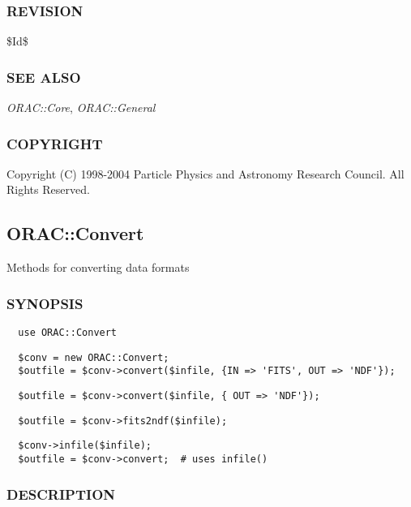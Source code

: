 \subsubsection*{REVISION\label{ORAC::Basic_REVISION}}


\$Id\$

\subsubsection*{SEE ALSO\label{ORAC::Basic_SEE_ALSO}}


\emph{ORAC::Core}, \emph{ORAC::General}

\subsubsection*{COPYRIGHT\label{ORAC::Basic_COPYRIGHT}}


Copyright (C) 1998-2004 Particle Physics and Astronomy Research
Council. All Rights Reserved.

\subsection{ORAC::Convert\label{ORAC::Convert}}


Methods for converting data formats

\subsubsection*{SYNOPSIS\label{ORAC::Convert_SYNOPSIS}}
\begin{verbatim}
  use ORAC::Convert
\end{verbatim}
\begin{verbatim}
  $conv = new ORAC::Convert;
  $outfile = $conv->convert($infile, {IN => 'FITS', OUT => 'NDF'});
\end{verbatim}
\begin{verbatim}
  $outfile = $conv->convert($infile, { OUT => 'NDF'});
\end{verbatim}
\begin{verbatim}
  $outfile = $conv->fits2ndf($infile);
\end{verbatim}
\begin{verbatim}
  $conv->infile($infile);
  $outfile = $conv->convert;  # uses infile()
\end{verbatim}
\subsubsection*{DESCRIPTION\label{ORAC::Convert_DESCRIPTION}}


